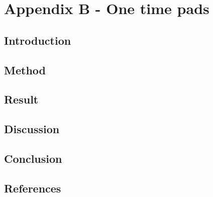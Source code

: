 \section{Appendix B - One time pads}

\subsection*{Introduction}

\subsection*{Method}

\subsection*{Result}

\subsection*{Discussion}

\subsection*{Conclusion}

\subsection*{References}